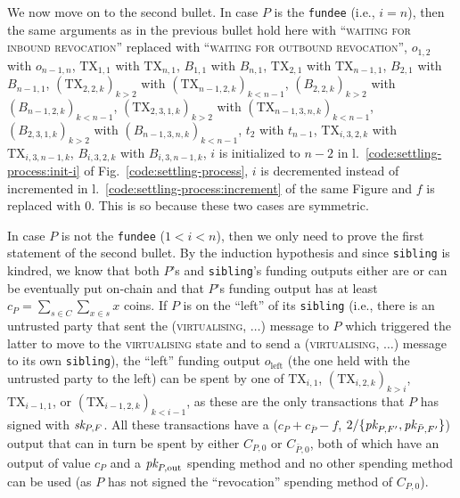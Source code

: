   We now move on to the second bullet. In case $P$ is the \texttt{fundee} (i.e.,
  $i=n$), then the same arguments as in the previous bullet hold here with
  ``\textsc{waiting for inbound revocation}'' replaced with ``\textsc{waiting
  for outbound revocation}'', $o_{1, 2}$ with $o_{n-1, n}$, $\mathrm{TX}_{1, 1}$
  with $\mathrm{TX}_{n, 1}$, $B_{1, 1}$ with $B_{n, 1}$, $\mathrm{TX}_{2, 1}$
  with $\mathrm{TX}_{n-1, 1}$, $B_{2, 1}$ with $B_{n-1, 1}$, $(\mathrm{TX}_{2,
  2, k})_{k > 2}$ with $(\mathrm{TX}_{n-1, 2, k})_{k < n-1}$, $(B_{2, 2, k})_{k
  > 2}$ with $(B_{n-1, 2, k})_{k < n-1}$, $(\mathrm{TX}_{2, 3, 1, k})_{k > 2}$
  with $(\mathrm{TX}_{n-1, 3, n, k})_{k < n-1}$, $(B_{2, 3, 1, k})_{k > 2}$ with
  $(B_{n-1, 3, n, k})_{k < n-1}$, $t_2$ with $t_{n-1}$, $\mathrm{TX}_{i, 3, 2,
  k}$ with $\mathrm{TX}_{i, 3, n-1, k}$, $B_{i, 3, 2, k}$ with $B_{i, 3, n-1,
  k}$, $i$ is initialized to $n-2$ in l.~\ref{code:settling-process:init-i} of
  Fig.~\ref{code:settling-process}, $i$ is decremented instead of incremented in
  l.~\ref{code:settling-process:increment} of the same Figure and $f$ is
  replaced with $0$. This is so because these two cases are symmetric.

  In case $P$ is not the \texttt{fundee} ($1<i<n$), then we only need to prove
  the first statement of the second bullet. By the induction hypothesis and
  since \texttt{sibling} is kindred, we know that both $P$'s and
  \texttt{sibling}'s funding outputs either are or can be eventually put
  on-chain and that $P$'s funding output has at least $c_P = \sum\limits_{s \in
  C} \sum\limits_{x \in s} x$ coins. If $P$ is on the ``left'' of its
  \texttt{sibling} (i.e., there is an untrusted party that sent the
  (\textsc{virtualising}, $\dots$) message to $P$ which triggered the latter to
  move to the \textsc{virtualising} state and to send a (\textsc{virtualising},
  $\dots$) message to its own \texttt{sibling}), the ``left'' funding output
  $o_{\mathrm{left}}$ (the one held with the untrusted party to the left) can be
  spent by one of $\mathrm{TX}_{i, 1}$, $(\mathrm{TX}_{i, 2, k})_{k > i}$,
  $\mathrm{TX}_{i-1, 1}$, or $(\mathrm{TX}_{i-1, 2, k})_{k < i-1}$, as these are
  the only transactions that $P$ has signed with $\textit{sk}_{P, F}$. All these
  transactions have a ($c_P + c_{\bar{P}} - f$, $2/\{\textit{pk}_{P, F'}, \textit{pk}_{\bar{P},
  F'}\}$) output that can in turn be spent by either $C_{P, 0}$ or $C_{\bar{P},
  0}$, both of which have an output of value $c_P$ and a $\textit{pk}_{P, \mathrm{out}}$
  spending method and no other spending method can be used (as $P$ has not
  signed the ``revocation'' spending method of $C_{P, 0}$).

